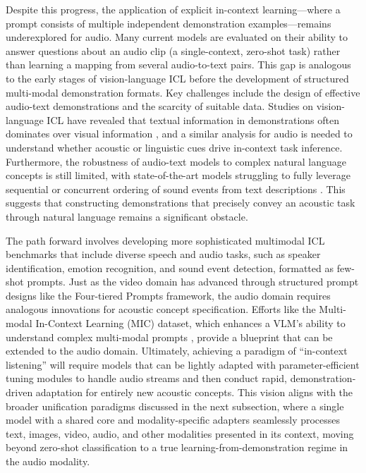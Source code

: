 \documentclass[11pt]{article}
\begin{document}
Despite this progress, the application of explicit in-context learning---where a prompt consists of multiple independent demonstration examples---remains underexplored for audio. Many current models are evaluated on their ability to answer questions about an audio clip (a single-context, zero-shot task) rather than learning a mapping from several audio-to-text pairs. This gap is analogous to the early stages of vision-language ICL before the development of structured multi-modal demonstration formats. Key challenges include the design of effective audio-text demonstrations and the scarcity of suitable data. Studies on vision-language ICL have revealed that textual information in demonstrations often dominates over visual information \cite{ref221}, and a similar analysis for audio is needed to understand whether acoustic or linguistic cues drive in-context task inference. Furthermore, the robustness of audio-text models to complex natural language concepts is still limited, with state-of-the-art models struggling to fully leverage sequential or concurrent ordering of sound events from text descriptions \cite{ref291}. This suggests that constructing demonstrations that precisely convey an acoustic task through natural language remains a significant obstacle.

The path forward involves developing more sophisticated multimodal ICL benchmarks that include diverse speech and audio tasks, such as speaker identification, emotion recognition, and sound event detection, formatted as few-shot prompts. Just as the video domain has advanced through structured prompt designs like the Four-tiered Prompts framework, the audio domain requires analogous innovations for acoustic concept specification. Efforts like the Multi-modal In-Context Learning (MIC) dataset, which enhances a VLM's ability to understand complex multi-modal prompts \cite{ref14}, provide a blueprint that can be extended to the audio domain. Ultimately, achieving a paradigm of ``in-context listening'' will require models that can be lightly adapted with parameter-efficient tuning modules to handle audio streams and then conduct rapid, demonstration-driven adaptation for entirely new acoustic concepts. This vision aligns with the broader unification paradigms discussed in the next subsection, where a single model with a shared core and modality-specific adapters seamlessly processes text, images, video, audio, and other modalities presented in its context, moving beyond zero-shot classification to a true learning-from-demonstration regime in the audio modality.
\end{document}
